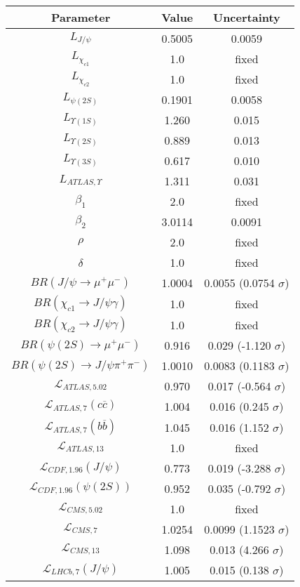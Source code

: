 \begin{table}[h!]
\centering
\begin{tabular}{c|c|c}
Parameter & Value & Uncertainty \\
\hline
$L_{J/\psi}$ & 0.5005 & 0.0059 \\
$L_{\chi_{c1}}$ & 1.0 & fixed \\
$L_{\chi_{c2}}$ & 1.0 & fixed \\
$L_{\psi(2S)}$ & 0.1901 & 0.0058 \\
$L_{\Upsilon(1S)}$ & 1.260 & 0.015 \\
$L_{\Upsilon(2S)}$ & 0.889 & 0.013 \\
$L_{\Upsilon(3S)}$ & 0.617 & 0.010 \\
$L_{ATLAS,\Upsilon}$ & 1.311 & 0.031 \\
$\beta_1$ & 2.0 & fixed \\
$\beta_2$ & 3.0114 & 0.0091 \\
$\rho$ & 2.0 & fixed \\
$\delta$ & 1.0 & fixed \\
$BR(J/\psi\rightarrow\mu^+\mu^-)$ & 1.0004 & 0.0055 (0.0754 $\sigma$) \\
$BR(\chi_{c1}\rightarrow J/\psi\gamma)$ & 1.0 & fixed \\
$BR(\chi_{c2}\rightarrow J/\psi\gamma)$ & 1.0 & fixed \\
$BR(\psi(2S)\rightarrow\mu^+\mu^-)$ & 0.916 & 0.029 (-1.120 $\sigma$) \\
$BR(\psi(2S)\rightarrow J/\psi\pi^+\pi^-)$ & 1.0010 & 0.0083 (0.1183 $\sigma$) \\
$\mathcal L_{ATLAS,5.02}$ & 0.970 & 0.017 (-0.564 $\sigma$) \\
$\mathcal L_{ATLAS,7}(c\overline c)$ & 1.004 & 0.016 (0.245 $\sigma$) \\
$\mathcal L_{ATLAS,7}(b\overline b)$ & 1.045 & 0.016 (1.152 $\sigma$) \\
$\mathcal L_{ATLAS,13}$ & 1.0 & fixed \\
$\mathcal L_{CDF,1.96}(J/\psi)$ & 0.773 & 0.019 (-3.288 $\sigma$) \\
$\mathcal L_{CDF,1.96}(\psi(2S))$ & 0.952 & 0.035 (-0.792 $\sigma$) \\
$\mathcal L_{CMS,5.02}$ & 1.0 & fixed \\
$\mathcal L_{CMS,7}$ & 1.0254 & 0.0099 (1.1523 $\sigma$) \\
$\mathcal L_{CMS,13}$ & 1.098 & 0.013 (4.266 $\sigma$) \\
$\mathcal L_{LHCb,7}(J/\psi)$ & 1.005 & 0.015 (0.138 $\sigma$) \\

\end{tabular}
\end{table}
